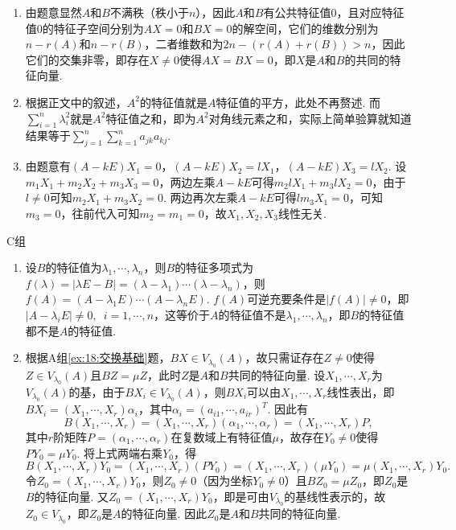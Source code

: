 \begin{enumerate}
    \item 由题意显然$A$和$B$不满秩（秩小于$n$），因此$A$和$B$有公共特征值0，且对应特征值0的特征子空间分别为$AX=0$和$BX=0$的解空间，它们的维数分别为$n-r(A)$和$n-r(B)$，二者维数和为$2n-(r(A)+r(B))>n$，因此它们的交集非零，即存在$X\neq 0$使得$AX=BX=0$，即$X$是$A$和$B$的共同的特征向量.

    \item 根据正文中的叙述，$A^2$的特征值就是$A$特征值的平方，此处不再赘述. 而$\displaystyle\sum_{i=1}^{n}\lambda_i^2$就是$A^2$特征值之和，即为$A^2$对角线元素之和，实际上简单验算就知道结果等于$\displaystyle\sum_{j=1}^{n}\displaystyle\sum_{k=1}^{n}a_{jk}a_{kj}$.

    \item 由题意有$(A-kE)X_1=0$，$(A-kE)X_2=lX_1$，$(A-kE)X_3=lX_2$. 设$m_1X_1+m_2X_2+m_3X_3=0$，两边左乘$A-kE$可得$m_2lX_1+m_3lX_2=0$，由于$l\neq 0$可知$m_2X_1+m_3X_2=0$. 两边再次左乘$A-kE$可得$lm_3X_1=0$，可知$m_3=0$，往前代入可知$m_2=m_1=0$，故$X_1,X_2,X_3$线性无关.
\end{enumerate}

\centerline{\heiti C组}
\begin{enumerate}
    \item 设$B$的特征值为$\lambda_1,\cdots,\lambda_n$，则$B$的特征多项式为$f(\lambda)=|\lambda E-B|=(\lambda-\lambda_1)\cdots(\lambda-\lambda_n)$，则$f(A)=(A-\lambda_1E)\cdots(A-\lambda_nE)$. $f(A)$可逆充要条件是$|f(A)|\neq 0$，即$|A-\lambda_iE|\neq 0,\enspace i=1,\cdots,n$，这等价于$A$的特征值不是$\lambda_1,\cdots,\lambda_n$，即$B$的特征值都不是$A$的特征值.

    \item 根据A组\ref*{ex:18:交换基础}题，$BX\in V_{\lambda_0}(A)$，故只需证存在$Z\neq 0$使得$Z\in V_{\lambda_0}(A)$且$BZ=\mu Z$，此时$Z$是$A$和$B$共同的特征向量. 设$X_1,\cdots,X_r$为$V_{\lambda_0}(A)$的基，由于$BX_i\in V_{\lambda_0}(A)$，则$BX_i$可以由$X_1,\cdots,X_r$线性表出，即$BX_i=(X_1,\cdots,X_r)\alpha_i$，其中$\alpha_i=(a_{i1},\cdots,a_{ir})^T$. 因此有
    \[B(X_1,\cdots,X_r)=(X_1,\cdots,X_r)(\alpha_1,\cdots,\alpha_r)=(X_1,\cdots,X_r)P,\]
    其中$r$阶矩阵$P=(\alpha_1,\cdots,\alpha_r)$在复数域上有特征值$\mu$，故存在$Y_0\neq 0$使得$PY_0=\mu Y_0$. 将上式两端右乘$Y_0$，得
    \[B(X_1,\cdots,X_r)Y_0=(X_1,\cdots,X_r)(PY_0)=(X_1,\cdots,X_r)(\mu Y_0)=\mu(X_1,\cdots,X_r)Y_0.\]
    令$Z_0=(X_1,\cdots,X_r)Y_0$，则$Z_0\neq 0$（因为坐标$Y_0\neq 0$）且$BZ_0=\mu Z_0$，即$Z_0$是$B$的特征向量. 又$Z_0=(X_1,\cdots,X_r)Y_0$，即是可由$V_{\lambda_0}$的基线性表示的，故$Z_0\in V_{\lambda_0}$，即$Z_0$是$A$的特征向量. 因此$Z_0$是$A$和$B$共同的特征向量.
\end{enumerate}

\clearpage
